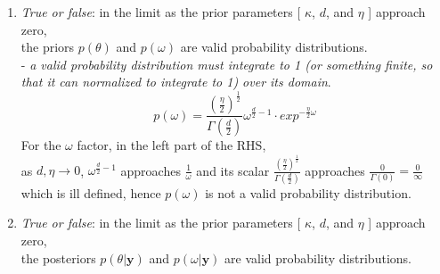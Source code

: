 \documentclass{homework}
\begin{document}
\begin{enumerate}[label=(\Alph*)]
\item \textit{True or false}: in the limit as the prior parameters [ $\kappa$, $d$, and $\eta$ ] approach zero, \\the priors $p(\theta)$ and $p(\omega)$ are valid probability distributions.
\\  - \textit{a valid probability distribution must integrate to 1 (or something finite, so that it can normalized to integrate to 1) over its domain}.
$$ p(\omega) = \frac{(\frac{\eta}{2})^{\frac{1}{2}}}{\Gamma(\frac{d}{2})} \omega^{\frac{d}{2} - 1} \cdot exp^{-\frac{\eta}{2}\omega}$$
For the $\omega$ factor, in the left part of the RHS, \\as $d, \eta \rightarrow 0$, $\omega^{\frac{d}{2} - 1}$ approaches $\frac{1}{\omega}$ and its scalar $ \frac{(\frac{\eta}{2})^{\frac{1}{2}}}{\Gamma(\frac{d}{2})} $ approaches $\frac{0}{\Gamma(0)} = \frac{0}{\infty}$ which is ill defined, hence $p(\omega)$ is not a valid probability distribution.  

\item \textit{True or false}: in the limit as the prior parameters [ $\kappa$, $d$, and $\eta$ ] approach zero, \\the posteriors $p(\theta | \textbf{y})$ and $p(\omega | \textbf{y})$ are valid probability distributions.


\end{enumerate}
\end{document}
